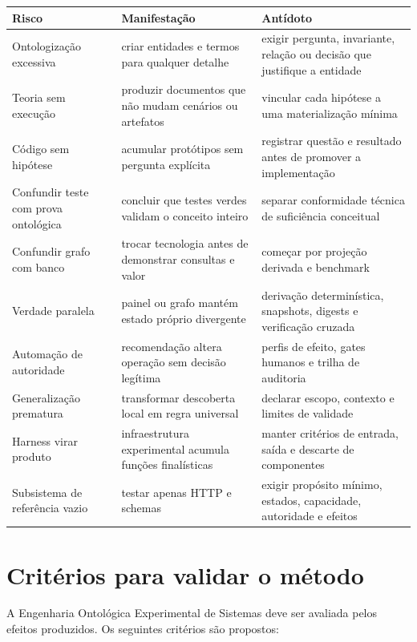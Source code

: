 \documentclass[11pt,a4paper,oneside]{article}
\begin{document}
\begin{longtable}{P{4.0cm}P{5.0cm}P{4.2cm}}
\toprule
\textbf{Risco} & \textbf{Manifestação} & \textbf{Antídoto} \\
\midrule
\endhead
Ontologização excessiva & criar entidades e termos para qualquer detalhe & exigir pergunta, invariante, relação ou decisão que justifique a entidade \\
Teoria sem execução & produzir documentos que não mudam cenários ou artefatos & vincular cada hipótese a uma materialização mínima \\
Código sem hipótese & acumular protótipos sem pergunta explícita & registrar questão e resultado antes de promover a implementação \\
Confundir teste com prova ontológica & concluir que testes verdes validam o conceito inteiro & separar conformidade técnica de suficiência conceitual \\
Confundir grafo com banco & trocar tecnologia antes de demonstrar consultas e valor & começar por projeção derivada e benchmark \\
Verdade paralela & painel ou grafo mantém estado próprio divergente & derivação determinística, snapshots, digests e verificação cruzada \\
Automação de autoridade & recomendação altera operação sem decisão legítima & perfis de efeito, gates humanos e trilha de auditoria \\
Generalização prematura & transformar descoberta local em regra universal & declarar escopo, contexto e limites de validade \\
Harness virar produto & infraestrutura experimental acumula funções finalísticas & manter critérios de entrada, saída e descarte de componentes \\
Subsistema de referência vazio & testar apenas HTTP e schemas & exigir propósito mínimo, estados, capacidade, autoridade e efeitos \\
\bottomrule
\end{longtable}

\section{Critérios para validar o método}

A Engenharia Ontológica Experimental de Sistemas deve ser avaliada pelos efeitos produzidos. Os seguintes critérios são propostos:
\end{document}
